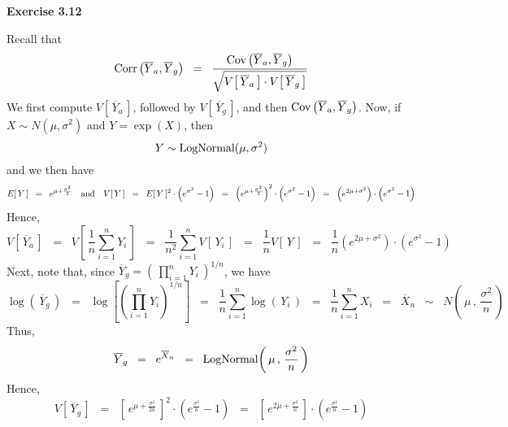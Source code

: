 
\noindent
\textbf{Exercise 3.12}

\vskip 0.3cm
\noindent

Recall that
\begin{equation*}
\textnormal{Corr}\left(\overline{Y}_{a},\overline{Y}_{g}\right)
\;\;=\;\;
\dfrac{\textnormal{Cov}\left(\overline{Y}_{a},\overline{Y}_{g}\right)}
{\sqrt{V\!\left[\,\overline{Y}_{a}\,\right]\cdot V\!\left[\,\overline{Y}_{g}\,\right]}}
\end{equation*}
We first compute $V\!\left[\,\overline{Y}_{a}\,\right]$, followed by
$V\!\left[\,\overline{Y}_{g}\,\right]$, and then
$\textnormal{Cov}\left(\overline{Y}_{a},\overline{Y}_{g}\right)$.
Now, if $X \sim N(\mu,\sigma^{2})$ and $Y = \exp(X)$, then
\begin{equation*}
Y \sim \textnormal{LogNormal}(\mu,\sigma^{2})
\end{equation*}
and we then have
\begin{equation*}
E[\,Y\,] \;\; = \;\; e^{\mu + \frac{\sigma^{2}}{2}}
\quad\textnormal{and}\quad
V[\,Y\,]
\;\; = \;\; E[\,Y\,]^{2}\cdot\left(e^{\sigma^{2}}-1\right)
\;\; = \;\; \left(e^{\mu+\frac{\sigma^{2}}{2}}\right)^{2}\cdot\left(e^{\sigma^{2}}-1\right)
\;\; = \;\; \left(e^{2\mu+\sigma^{2}}\right)\cdot\left(e^{\sigma^{2}}-1\right)
\end{equation*}
Hence,
\begin{equation*}
V\left[\,\overline{Y}_{a}\,\right]
\;\; = \;\;
V\left[\,\dfrac{1}{n}\sum_{i=1}^{n}Y_{i}\,\right]
\;\; = \;\;
\dfrac{1}{n^{2}}\sum_{i=1}^{n}V\left[\,Y_{i}\,\right]
\;\; = \;\;
\dfrac{1}{n}V\left[\,Y\,\right]
\;\; = \;\;
\dfrac{1}{n} \left(e^{2\mu+\sigma^{2}}\right)\cdot\left(e^{\sigma^{2}}-1\right)
\end{equation*}
Next, note that, since $\overline{Y}_{g} = \left(\,\prod_{i=1}^{n}Y_{i}\,\right)^{1/n}$,
we have
\begin{equation*}
\log\left(\,\overline{Y}_{g}\,\right)
\;\; = \;\;
\log\left[\left(\prod_{i=1}^{n}Y_{i}\right)^{1/n}\right]
\;\; = \;\;
\dfrac{1}{n}\sum_{i=1}^{n}\log\left(\,Y_{i}\,\right)
\;\; = \;\;
\dfrac{1}{n}\sum_{i=1}^{n}X_{i}
\;\; = \;\;
\overline{X}_{n}
\;\; \sim \;\;
N\!\left(\,\mu\,,\,\dfrac{\sigma^{2}}{n}\,\right)
\end{equation*}
Thus,
\begin{equation*}
\overline{Y}_{g}
\;\; = \;\;
e^{\overline{X}_{n}}
\;\; = \;\;
\textnormal{LogNormal}\!\left(\,\mu\,,\,\dfrac{\sigma^{2}}{n}\,\right)
\end{equation*}
Hence,
\begin{equation*}
V\!\left[\,\overline{Y}_{g}\,\right]
\;\; = \;\;
\left[\,e^{\mu+\frac{\sigma^{2}}{2n}}\,\right]^{2}
\cdot
\left(e^{\frac{\sigma^{2}}{n}} - 1\right)
\;\; = \;\;
\left[\,e^{2\mu+\frac{\sigma^{2}}{n}}\,\right]
\cdot
\left(e^{\frac{\sigma^{2}}{n}} - 1\right)
\end{equation*}
